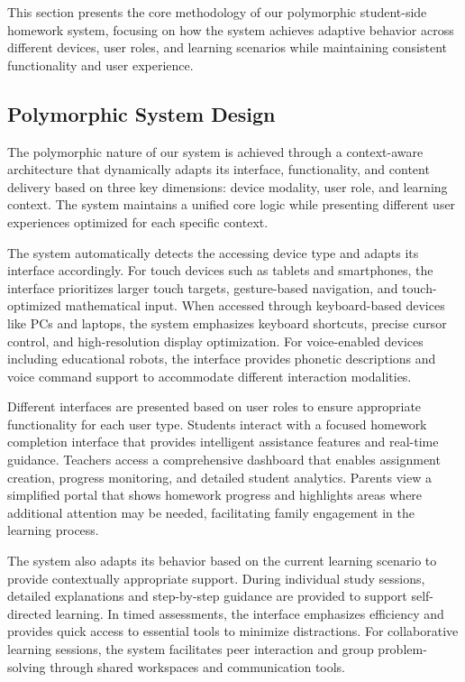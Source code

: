 \documentclass[conference]{IEEEtran}
\begin{document}
\begin{IEEEkeywords}
This section presents the core methodology of our polymorphic student-side homework system, focusing on how the system achieves adaptive behavior across different devices, user roles, and learning scenarios while maintaining consistent functionality and user experience.

\subsection{Polymorphic System Design}

The polymorphic nature of our system is achieved through a context-aware architecture that dynamically adapts its interface, functionality, and content delivery based on three key dimensions: device modality, user role, and learning context. The system maintains a unified core logic while presenting different user experiences optimized for each specific context.

The system automatically detects the accessing device type and adapts its interface accordingly. For touch devices such as tablets and smartphones, the interface prioritizes larger touch targets, gesture-based navigation, and touch-optimized mathematical input. When accessed through keyboard-based devices like PCs and laptops, the system emphasizes keyboard shortcuts, precise cursor control, and high-resolution display optimization. For voice-enabled devices including educational robots, the interface provides phonetic descriptions and voice command support to accommodate different interaction modalities.

Different interfaces are presented based on user roles to ensure appropriate functionality for each user type. Students interact with a focused homework completion interface that provides intelligent assistance features and real-time guidance. Teachers access a comprehensive dashboard that enables assignment creation, progress monitoring, and detailed student analytics. Parents view a simplified portal that shows homework progress and highlights areas where additional attention may be needed, facilitating family engagement in the learning process.

The system also adapts its behavior based on the current learning scenario to provide contextually appropriate support. During individual study sessions, detailed explanations and step-by-step guidance are provided to support self-directed learning. In timed assessments, the interface emphasizes efficiency and provides quick access to essential tools to minimize distractions. For collaborative learning sessions, the system facilitates peer interaction and group problem-solving through shared workspaces and communication tools.


\end{IEEEkeywords}
\end{document}
